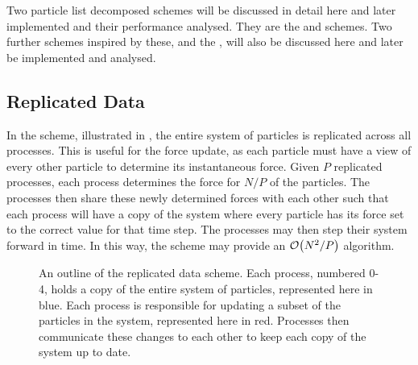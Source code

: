 %
Two particle list decomposed schemes will be discussed in detail here and
later implemented and their performance analysed.
%
They are the \replicateddata{} and \systolicloop{} schemes.
%
Two further schemes inspired by these, \sharedandreplicateddata{} and the
\replicatedsystolicloop{}, will also be discussed here and
later be implemented and analysed.



\subsection{Replicated Data}
\label{sec:background:subsec:replicated_data}

%
In the \replicateddata{} scheme, illustrated in
,
the entire system of particles is replicated across all processes.
%
This is useful for the force update, as each particle must have a view of
every other particle to determine its instantaneous force.
%
Given $P$ replicated processes,
each process determines the force for $N/P$ of the particles.
%
The processes then share these newly determined forces with each other
such that each process will have a copy of the system where every
particle has its force set to the correct value for that time step.
%
The processes may then step their system forward in time.
%
In this way, the \replicateddata{} scheme may provide
an $\mathcal{O}{\left({ N^2/P }\right)}$ algorithm.


\begin{figure}
    \begin{center}
    \end{center}
    \caption{
        An outline of the replicated data scheme.
        Each process, numbered 0-4,
        holds a copy of the entire system of particles,
        represented here in blue.
        Each process is responsible for updating a subset of the
        particles in the system, represented here in red.
        Processes then communicate these changes to each other
        to keep each copy of the system up to date.
    }
    \label{fig:replicated_data_illustration}
\end{figure}


